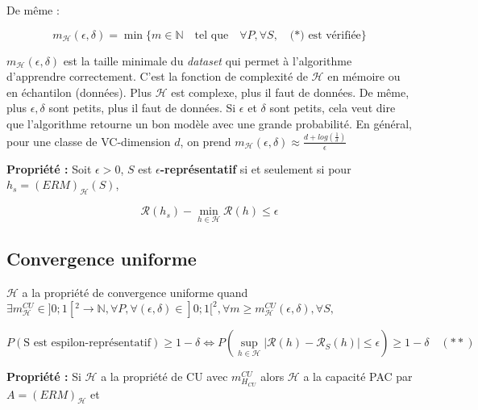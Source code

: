 \noindent De même :

\begin{equation}
    m_{\mathcal{H}}(\epsilon, \delta) = \min \{m \in \mathbb{N} \quad \text{tel que} \quad \forall P, \forall S, \quad \text{(*) est vérifiée}\}
\end{equation}

\noindent $m_{\mathcal{H}}(\epsilon, \delta)$ est la taille minimale du \textit{dataset} qui permet à l'algorithme d'apprendre correctement. C'est
la fonction de complexité de $\mathcal{H}$ en mémoire ou en échantilon (données). Plus $\mathcal{H}$ est complexe, plus il faut de données. De même, plus $\epsilon, \delta$ sont petits,
plus il faut de données. Si $\epsilon$ et $\delta$ sont petits, cela veut dire que l'algorithme retourne un bon modèle avec une grande probabilité. En général, pour une classe de VC-dimension $d$, on prend 
$m_{\mathcal{H}}(\epsilon, \delta) \approx \frac{d + log(\frac{1}{\delta})}{\epsilon}$\newline

\noindent \textbf{Propriété :} Soit $\epsilon > 0$, $S$ est \textbf{$\epsilon$-représentatif} si et seulement si pour $h_s = (ERM)_{\mathcal{H}}(S)$,

\begin{equation}
    \mathcal{R}(h_s) - \min_{h \in \mathcal{H}} \mathcal{R}(h) \leq \epsilon
\end{equation}

\newpage

\subsection{Convergence uniforme}

\noindent $\mathcal{H}$ a la propriété de convergence uniforme quand $\exists m_{\mathcal{H}}^{CU} \in ]0;1[^{2} \rightarrow \mathbb{N},
\forall P, \forall (\epsilon, \delta) \in  ]0;1[^{2}, \forall m \geq m_{\mathcal{H}}^{CU}(\epsilon, \delta), \forall S,$

\begin{equation}
    P(\text{S est espilon-représentatif}) \geq 1 - \delta \Longleftrightarrow
    P(\sup_{h \in \mathcal{H}} | \mathcal{R}(h) - \mathcal{R}_S(h) | \leq \epsilon) \geq 1 - \delta \quad (**) \nonumber
\end{equation}

\noindent \textbf{Propriété :} Si $\mathcal{H}$ a la propriété de CU avec $m_{H_{CU}}^{CU}$ alors $\mathcal{H}$ a la capacité PAC par $A = (ERM)_{\mathcal{H}}$ et 

